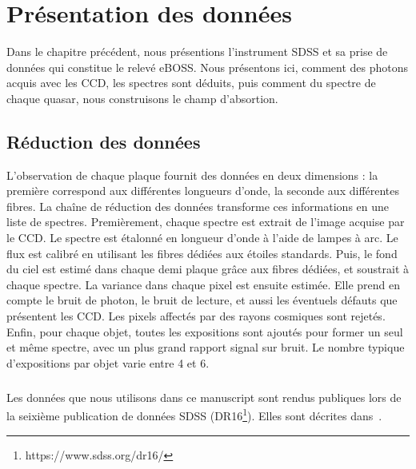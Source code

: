 \documentclass[11pt, twoside, a4paper, openright]{report}
\begin{document}

\graphicspath{ {../figures/donnees/} }

\chapter{Présentation des données}
\minitoc
\newpage
\thispagestyle{fancy}

Dans le chapitre précédent, nous présentions l'instrument SDSS et sa prise de données qui constitue le relevé eBOSS. Nous présentons ici, comment des photons acquis avec les CCD, les spectres sont déduits, puis comment du spectre de chaque quasar, nous construisons le champ d'absortion.

\section{Réduction des données}
L'observation de chaque plaque fournit des données en deux dimensions : la première correspond aux différentes longueurs d'onde, la seconde aux différentes fibres. La chaîne de réduction des données transforme ces informations en une liste de spectres.
Premièrement, chaque spectre est extrait de l'image acquise par le CCD. Le spectre est étalonné en longueur d'onde à l'aide de lampes à arc. Le flux est calibré en utilisant les fibres dédiées aux étoiles standards. Puis, le fond du ciel est estimé dans chaque demi plaque grâce aux fibres dédiées, et soustrait à chaque spectre.
La variance dans chaque pixel est ensuite estimée. Elle prend en compte le bruit de photon, le bruit de lecture, et aussi les éventuels défauts que présentent les CCD. Les pixels affectés par des rayons cosmiques sont rejetés.
Enfin, pour chaque objet, toutes les expositions sont ajoutés pour former un seul et même spectre, avec un plus grand rapport signal sur bruit. Le nombre typique d'expositions par objet varie entre 4 et 6.

\paragraph{}
Les données que nous utilisons dans ce manuscript sont rendus publiques lors de la seixième publication de données SDSS (DR16\footnote{https://www.sdss.org/dr16/}). Elles sont décrites dans~\cite{Ahumada2019}.
\end{document}
